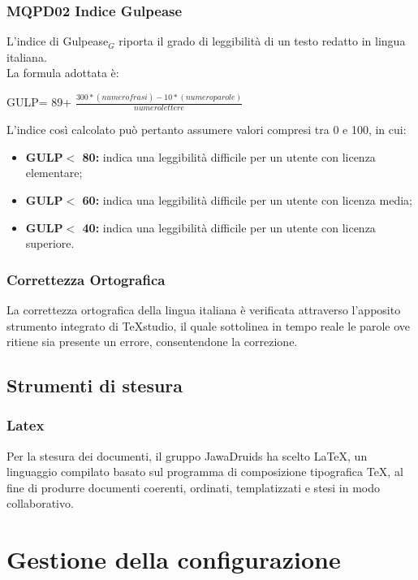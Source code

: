 \subsubsection{MQPD02 Indice Gulpease}\label{ProcessiDiSupportoDocumentazioneMetricheMQPD02IndiceGulpease}
L'indice di Gulpease$_G$ riporta il grado di leggibilità di un testo redatto in lingua italiana.\\
La formula adottata è:
\begin{center}
  GULP= 89+ $\frac{300*(numero frasi)-10*(numero parole)}{numero lettere}$
\end{center}
L'indice così calcolato può pertanto assumere valori compresi tra 0 e 100, in cui:
\begin{itemize}
\item \textbf{GULP$<$ 80:} indica una leggibilità difficile per un utente con licenza elementare;
\item \textbf{GULP$<$ 60:} indica una leggibilità difficile per un utente con licenza media;
\item \textbf{GULP$<$ 40:} indica una leggibilità difficile per un utente con licenza superiore.
\end{itemize}

\subsubsection{Correttezza Ortografica}\label{ProcessiDiSupportoDocumentazioneMetricheCorrettezzaOrtografica}
La correttezza ortografica della lingua italiana è verificata attraverso l'apposito strumento integrato di \TeX studio, il quale sottolinea in tempo reale le parole ove ritiene sia presente un errore, consentendone la correzione.


\subsection{Strumenti di stesura}\label{ProcessiDiSupportoDocumentazioneStrumentiDiStesura}
\subsubsection{Latex}\label{ProcessiDiSupportoDocumentazioneStrumentiDiStesuraLatex}
Per la stesura dei documenti, il gruppo JawaDruids ha scelto \LaTeX, un linguaggio compilato basato sul programma di composizione tipografica \TeX, al fine di produrre documenti coerenti, ordinati, templatizzati e stesi in modo collaborativo.
\section{Gestione della configurazione}\label{ProcessiDiSupportoGestioneDellaConfigurazione}
